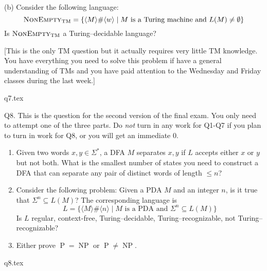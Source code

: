 (b) Consider the following language:
\[
\operatorname{\text{\textsc{NonEmpty}}}_{\operatorname{TM}} = \{
\langle M \rangle 
\#
\langle w \rangle
\mid
M \text{ is a Turing machine and }
L(M) \neq \emptyset
\}
\]
Is $\operatorname{\text{\textsc{NonEmpty}}}_{\operatorname{TM}}$ a Turing--decidable language?

[This is the only TM question but it actually requires very little
TM knowledge.
You have everything you need to solve this
problem if have a general understanding of TMs and
you have paid attention to the Wednesday and Friday
classes during the last week.]

\SOLUTION

 {q7.tex}




\newpage
Q8. This is the question for the second version of the final exam.
You only need to attempt one of the three parts.
Do \textit{not} turn in any work for Q1-Q7 if you plan to turn in 
work for Q8, or you will get an immediate 0.

\begin{enumerate}

\item
Given two words $x, y \in \Sigma^*$, a DFA
$M$ separates $x, y$ if $L$ accepts either $x$ or $y$ but not both.
What is the smallest number of states you need to construct a
DFA
that can separate any pair of distinct words of length $\leq n$?

\item Consider the following problem:
Given a PDA $M$ and an integer $n$, is it true that
$\Sigma^n \subseteq L(M)$?
The corresponding language is
\[
L = \{\langle M \rangle \# \langle n \rangle \mid
M \text{ is a PDA and } \Sigma^n \subseteq L(M)
\}
\]
Is $L$ regular, context-free, Turing--decidable, Turing--recognizable,
not Turing--recognizable?

\item
Either prove 
$\operatorname{P} = \operatorname{NP}$ or
$\operatorname{P} \neq \operatorname{NP}$.

\end{enumerate}

\SOLUTION

 {q8.tex}



